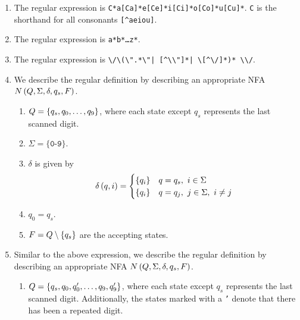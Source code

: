 \begin{solution}\label{sol:030305}
    \begin{enumerate}[label=\alph*)]
        \item The regular expression is \texttt{C*a[Ca]*e[Ce]*i[Ci]*o[Co]*u[Cu]*}.
        \texttt{C} is the shorthand for all consonants \texttt{[\^{}aeiou]}.
        \item The regular expression is \texttt{a*b*\dots z*}.
        \item The regular expression is \texttt{\textbackslash/\textbackslash*%
        (\textbackslash".*\textbackslash"|%
        [\^{}\textbackslash*\textbackslash"]*|%
        \textbackslash*[\^{}\textbackslash/]*)*%
        \textbackslash*\textbackslash/}.
        \item We describe the regular definition by describing an appropriate NFA
        $N\left( Q, \Sigma, \delta, q_s, F \right)$.
        \begin{enumerate}[label=\roman*)]
            \item $Q = \left\{ q_s, q_0, \ldots, q_9 \right\}$, where each state except $q_s$ 
            represents the last scanned digit.
            \item $\Sigma = \{\texttt{0-9}\}$.
            \item $\delta$ is given by
            \begin{align*}
                \delta\left( q, i \right) = 
                \begin{cases}
                    \left\{ q_i \right\} & q = q_s,\ i \in \Sigma \\
                    \left\{ q_i \right\} & q = q_j,\ j \in \Sigma,\ i \neq j
                \end{cases}
            \end{align*}
            \item $q_0 = q_s$.
            \item $F = Q \setminus \left\{ q_s \right\}$ are the accepting states.
        \end{enumerate}
        \item Similar to the above expression, we describe the regular definition 
        by describing an appropriate NFA $N\left( Q, \Sigma, \delta, q_s, F \right)$.
        \begin{enumerate}[label=\roman*)]
            \item $Q = \left\{ q_s, q_0, q_0', \ldots, q_9, q_9' \right\}$, where each state 
            except $q_s$ represents the last scanned digit. Additionally, the states
            marked with a \texttt{'} denote that there has been a repeated digit.

\end{enumerate}
\end{enumerate}
\end{solution}
